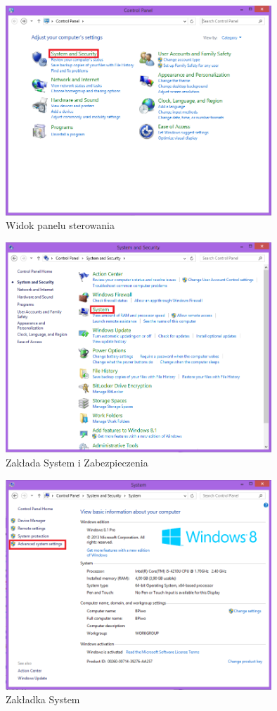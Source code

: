 \begin{figure}[h]
\centering
\includegraphics[width=10cm]{Zdjecia/5/anaconda1}
\caption{Widok panelu sterowania}
\label{fig:anaconda1}
\end{figure}

\begin{figure}[h]
\centering
\includegraphics[width=10cm]{Zdjecia/5/anaconda2}
\caption{Zakłada System i Zabezpieczenia}
\label{fig:anaconda2}
\end{figure}

\begin{figure}[h]
\centering
\includegraphics[width=10cm]{Zdjecia/5/anaconda3}
\caption{Zakładka System}
\label{fig:anaconda3}
\end{figure}

